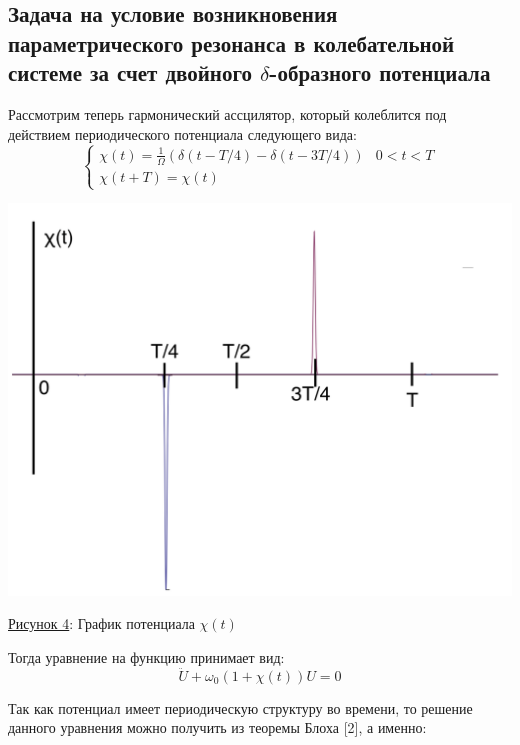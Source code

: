 \documentclass[11pt]{article}    %
\begin{document}
\subsection{Задача на условие возникновения параметрического резонанса в колебательной системе за счет двойного $\delta$-образного потенциала}
\par Рассмотрим теперь гармонический ассцилятор, который колеблится под действием периодического потенциала следующего вида:
\begin{equation}
    \begin{cases}
    \chi(t) = \frac{1}{\Omega}(\delta(t-T/4) - \delta(t-3T/4)) & 0 < t < T
    \\
    \chi(t+T) = \chi(t)
    \end{cases}
\end{equation}
\par
\begin{center}
\includegraphics[scale = 0.55]{ertyu6r567.png}
\par
    \underline{Рисунок 4}: График потенциала $\chi(t)$
\end{center}
\par Тогда уравнение на функцию принимает вид:
\begin{equation}
    \ddot{U} + \omega_0 (1+\chi(t))U = 0
\end{equation}
\par Так как потенциал имеет периодическую структуру во времени, то решение данного уравнения можно получить из теоремы Блоха [2], а именно:
\end{document}
